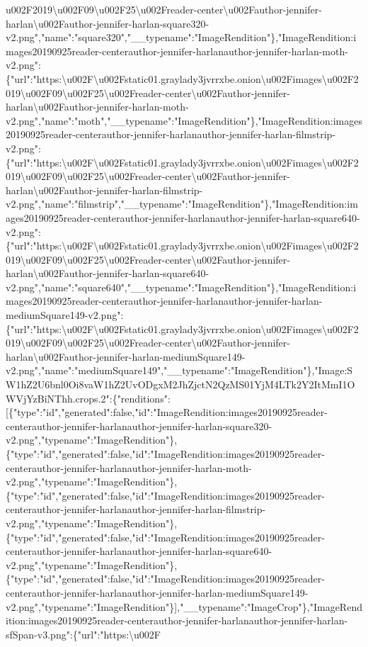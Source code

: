 u002F2019\textbackslash{}u002F09\textbackslash{}u002F25\textbackslash{}u002Freader-center\textbackslash{}u002Fauthor-jennifer-harlan\textbackslash{}u002Fauthor-jennifer-harlan-square320-v2.png","name":"square320","\_\_typename":"ImageRendition"\},"ImageRendition:images20190925reader-centerauthor-jennifer-harlanauthor-jennifer-harlan-moth-v2.png":\{"url":"https:\textbackslash{}u002F\textbackslash{}u002Fstatic01.graylady3jvrrxbe.onion\textbackslash{}u002Fimages\textbackslash{}u002F2019\textbackslash{}u002F09\textbackslash{}u002F25\textbackslash{}u002Freader-center\textbackslash{}u002Fauthor-jennifer-harlan\textbackslash{}u002Fauthor-jennifer-harlan-moth-v2.png","name":"moth","\_\_typename":"ImageRendition"\},"ImageRendition:images20190925reader-centerauthor-jennifer-harlanauthor-jennifer-harlan-filmstrip-v2.png":\{"url":"https:\textbackslash{}u002F\textbackslash{}u002Fstatic01.graylady3jvrrxbe.onion\textbackslash{}u002Fimages\textbackslash{}u002F2019\textbackslash{}u002F09\textbackslash{}u002F25\textbackslash{}u002Freader-center\textbackslash{}u002Fauthor-jennifer-harlan\textbackslash{}u002Fauthor-jennifer-harlan-filmstrip-v2.png","name":"filmstrip","\_\_typename":"ImageRendition"\},"ImageRendition:images20190925reader-centerauthor-jennifer-harlanauthor-jennifer-harlan-square640-v2.png":\{"url":"https:\textbackslash{}u002F\textbackslash{}u002Fstatic01.graylady3jvrrxbe.onion\textbackslash{}u002Fimages\textbackslash{}u002F2019\textbackslash{}u002F09\textbackslash{}u002F25\textbackslash{}u002Freader-center\textbackslash{}u002Fauthor-jennifer-harlan\textbackslash{}u002Fauthor-jennifer-harlan-square640-v2.png","name":"square640","\_\_typename":"ImageRendition"\},"ImageRendition:images20190925reader-centerauthor-jennifer-harlanauthor-jennifer-harlan-mediumSquare149-v2.png":\{"url":"https:\textbackslash{}u002F\textbackslash{}u002Fstatic01.graylady3jvrrxbe.onion\textbackslash{}u002Fimages\textbackslash{}u002F2019\textbackslash{}u002F09\textbackslash{}u002F25\textbackslash{}u002Freader-center\textbackslash{}u002Fauthor-jennifer-harlan\textbackslash{}u002Fauthor-jennifer-harlan-mediumSquare149-v2.png","name":"mediumSquare149","\_\_typename":"ImageRendition"\},"Image:SW1hZ2U6bnl0Oi8vaW1hZ2UvODgxM2JhZjctN2QzMS01YjM4LTk2Y2ItMmI1OWVjYzBiNThh.crops.2":\{"renditions":{[}\{"type":"id","generated":false,"id":"ImageRendition:images20190925reader-centerauthor-jennifer-harlanauthor-jennifer-harlan-square320-v2.png","typename":"ImageRendition"\},\{"type":"id","generated":false,"id":"ImageRendition:images20190925reader-centerauthor-jennifer-harlanauthor-jennifer-harlan-moth-v2.png","typename":"ImageRendition"\},\{"type":"id","generated":false,"id":"ImageRendition:images20190925reader-centerauthor-jennifer-harlanauthor-jennifer-harlan-filmstrip-v2.png","typename":"ImageRendition"\},\{"type":"id","generated":false,"id":"ImageRendition:images20190925reader-centerauthor-jennifer-harlanauthor-jennifer-harlan-square640-v2.png","typename":"ImageRendition"\},\{"type":"id","generated":false,"id":"ImageRendition:images20190925reader-centerauthor-jennifer-harlanauthor-jennifer-harlan-mediumSquare149-v2.png","typename":"ImageRendition"\}{]},"\_\_typename":"ImageCrop"\},"ImageRendition:images20190925reader-centerauthor-jennifer-harlanauthor-jennifer-harlan-sfSpan-v3.png":\{"url":"https:\textbackslash{}u002F\textb